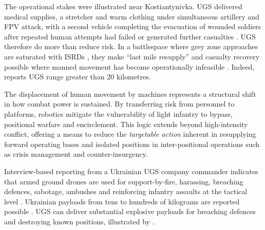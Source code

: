 {The operational stakes were illustrated near Kostiantynivka. UGS delivered medical supplies, a stretcher and warm clothing under simultaneous artillery and FPV attack, with a second vehicle completing the evacuation of wounded soldiers after repeated human attempts had failed or generated further casualties \parencite{Kirichenko_2026B,bendett_2024_06_17}. UGS therefore do more than reduce risk. In a battlespace where grey zone approaches are saturated with ISRDs \parencite{david_participant_2}, they make ``last mile resupply'' and casualty recovery possible where manned movement has become operationally infeasible \parencite[40:00--41:52]{lyle_23_interview}. Indeed, \textcite[18:50--28:00]{taylor_ukr} reports UGS range greater than $20$ kilometres. 

The displacement of human movement by machines represents a structural shift in how combat power is sustained. By transferring risk from personnel to platforms, robotics mitigate the vulnerability of light infantry to bypass, positional warfare and encirclement. This logic extends beyond high-intensity conflict, offering a means to reduce the \textit{targetable action} inherent in resupplying forward operating bases and isolated positions in inter-positional operations such as crisis management and counter-insurgency.



Interview-based reporting from a Ukrainian UGS company commander indicates that armed ground drones are used for support-by-fire, harassing, breaching defences, sabotage, ambushes and reinforcing infantry assaults at the tactical level \parencite{devdroid_2026_drones_change_warfare_interview,suprun_2025_09_05_nc13_nrk_interview,third_army_corps_2025_2_26}. Ukrainian payloads from tens to hundreds of kilograms are reported possible \parencite{United24Media_2024_10_25_UGS}. UGS can deliver substantial explosive payloads for breaching defences and destroying known positions, illustrated by \textcite{Fedorov_2024_4_2,drone_surrender_1}.

}

